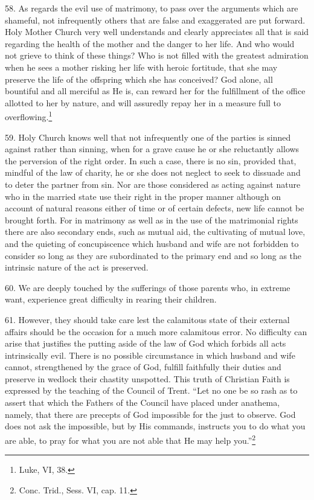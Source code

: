 \documentclass[12pt,a4paper]{book}
\begin{document}
58. As regards the evil use of matrimony, to pass over the arguments which are shameful, not infrequently others that are false and exaggerated are put forward. Holy Mother Church very well understands and clearly appreciates all that is said regarding the health of the mother and the danger to her life. And who would not grieve to think of these things? Who is not filled with the greatest admiration when he sees a mother risking her life with heroic fortitude, that she may preserve the life of the offspring which she has conceived? God alone, all bountiful and all merciful as He is, can reward her for the fulfillment of the office allotted to her by nature, and will assuredly repay her in a measure full to overflowing.\footnote{Luke, VI, 38.}

59. Holy Church knows well that not infrequently one of the parties is sinned against rather than sinning, when for a grave cause he or she reluctantly allows the perversion of the right order. In such a case, there is no sin, provided that, mindful of the law of charity, he or she does not neglect to seek to dissuade and to deter the partner from sin. Nor are those considered as acting against nature who in the married state use their right in the proper manner although on account of natural reasons either of time or of certain defects, new life cannot be brought forth. For in matrimony as well as in the use of the matrimonial rights there are also secondary ends, such as mutual aid, the cultivating of mutual love, and the quieting of concupiscence which husband and wife are not forbidden to consider so long as they are subordinated to the primary end and so long as the intrinsic nature of the act is preserved.

60. We are deeply touched by the sufferings of those parents who, in extreme want, experience great difficulty in rearing their children.

61. However, they should take care lest the calamitous state of their external affairs should be the occasion for a much more calamitous error. No difficulty can arise that justifies the putting aside of the law of God which forbids all acts intrinsically evil. There is no possible circumstance in which husband and wife cannot, strengthened by the grace of God, fulfill faithfully their duties and preserve in wedlock their chastity unspotted. This truth of Christian Faith is expressed by the teaching of the Council of Trent. ``Let no one be so rash as to assert that which the Fathers of the Council have placed under anathema, namely, that there are precepts of God impossible for the just to observe. God does not ask the impossible, but by His commands, instructs you to do what you are able, to pray for what you are not able that He may help you.''\footnote{Conc. Trid., Sess. VI, cap. 11.}
\end{document}
